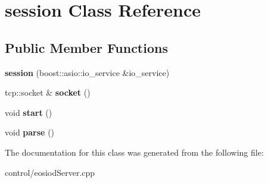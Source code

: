 \hypertarget{classsession}{}\section{session Class Reference}
\label{classsession}
\subsection*{Public Member Functions}
\begin{DoxyCompactItemize}
\item 
\mbox{\label{classsession_ae8ec671941d1b8c7ac1b54978692cc85}} 
{\bfseries session} (boost\+::asio\+::io\+\_\+service \&io\+\_\+service)
\item 
\mbox{\label{classsession_a877765bc7124ada6580ad2f748b4d72c}} 
tcp\+::socket \& {\bfseries socket} ()
\item 
\mbox{\label{classsession_ad69144e27f558b8960efae132f2e15f4}} 
void {\bfseries start} ()
\item 
\mbox{\label{classsession_a07999ceff60bc59bab2d4b53e0c4cc9a}} 
void {\bfseries parse} ()
\end{DoxyCompactItemize}


The documentation for this class was generated from the following file\+:\begin{DoxyCompactItemize}
\item 
control/eosiod\+Server.\+cpp\end{DoxyCompactItemize}
